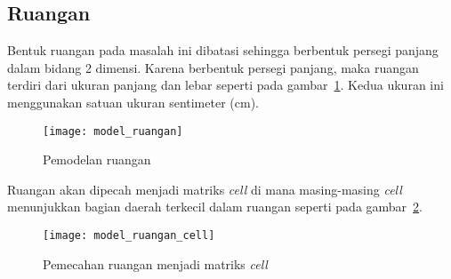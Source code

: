 \subsection{Ruangan}
Bentuk ruangan pada masalah ini dibatasi sehingga berbentuk persegi panjang dalam bidang 2 dimensi. Karena berbentuk persegi panjang, maka ruangan terdiri dari ukuran panjang dan lebar seperti pada gambar~\ref{fig:model_ruangan}. Kedua ukuran ini menggunakan satuan ukuran sentimeter (cm).

\begin{figure}[H]
	\centering  
	\texttt{[image: model\_ruangan]}
	\caption[Pemodelan ruangan]{Pemodelan ruangan} 
	\label{fig:model_ruangan}
\end{figure}


Ruangan akan dipecah menjadi matriks \textit{cell} di mana masing-masing \textit{cell} menunjukkan bagian daerah terkecil dalam ruangan seperti pada gambar~\ref{fig:model_ruangan_cell}.

\begin{figure}[h]
	\centering  
	\texttt{[image: model\_ruangan\_cell]}
	\caption[Pemecahan ruangan menjadi matriks \textit{cell}]{Pemecahan ruangan menjadi matriks \textit{cell}} 
	\label{fig:model_ruangan_cell}
\end{figure}

